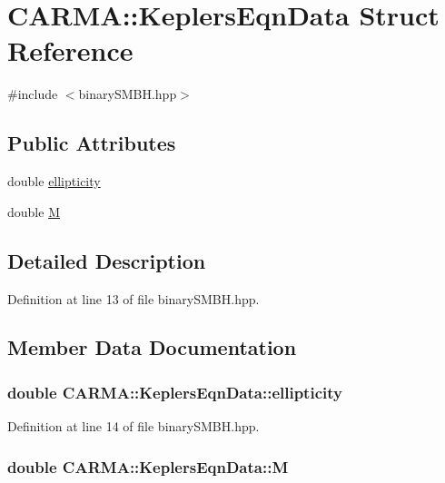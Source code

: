 \hypertarget{struct_c_a_r_m_a_1_1_keplers_eqn_data}{\section{C\-A\-R\-M\-A\-:\-:Keplers\-Eqn\-Data Struct Reference}
\label{struct_c_a_r_m_a_1_1_keplers_eqn_data}
}


{\ttfamily \#include $<$binary\-S\-M\-B\-H.\-hpp$>$}

\subsection*{Public Attributes}
\begin{DoxyCompactItemize}
\item 
double \hyperlink{struct_c_a_r_m_a_1_1_keplers_eqn_data_afd10ecbb798c5b8d731ba6e210cc984d}{ellipticity}
\item 
double \hyperlink{struct_c_a_r_m_a_1_1_keplers_eqn_data_ad31b095f150ee7b81dfc98d7e37f76d7}{M}
\end{DoxyCompactItemize}


\subsection{Detailed Description}


Definition at line 13 of file binary\-S\-M\-B\-H.\-hpp.



\subsection{Member Data Documentation}
\hypertarget{struct_c_a_r_m_a_1_1_keplers_eqn_data_afd10ecbb798c5b8d731ba6e210cc984d}{
\subsubsection[{ellipticity}]{\setlength{\rightskip}{0pt plus 5cm}double C\-A\-R\-M\-A\-::\-Keplers\-Eqn\-Data\-::ellipticity}}\label{struct_c_a_r_m_a_1_1_keplers_eqn_data_afd10ecbb798c5b8d731ba6e210cc984d}


Definition at line 14 of file binary\-S\-M\-B\-H.\-hpp.

\hypertarget{struct_c_a_r_m_a_1_1_keplers_eqn_data_ad31b095f150ee7b81dfc98d7e37f76d7}{
\subsubsection[{M}]{\setlength{\rightskip}{0pt plus 5cm}double C\-A\-R\-M\-A\-::\-Keplers\-Eqn\-Data\-::\-M}}\label{struct_c_a_r_m_a_1_1_keplers_eqn_data_ad31b095f150ee7b81dfc98d7e37f76d7}


